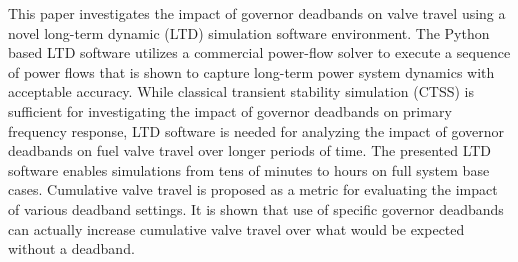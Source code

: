 %
This paper investigates the impact of governor deadbands on valve travel using a novel long-term dynamic (LTD) simulation software environment. 
The Python based LTD software utilizes a commercial power-flow solver to execute a sequence of power flows that is shown to capture long-term power system dynamics with acceptable accuracy.
While classical transient stability simulation (CTSS) is sufficient for investigating the impact of governor deadbands on primary frequency response, LTD software is needed for analyzing the impact of governor deadbands on fuel valve travel over longer periods of time. 
The presented LTD software enables simulations from tens of minutes to hours on full system base cases. %
Cumulative valve travel is proposed as a metric for evaluating the impact of various deadband settings.
It is shown that use of specific governor deadbands can actually increase cumulative valve travel over what would be expected without a deadband.